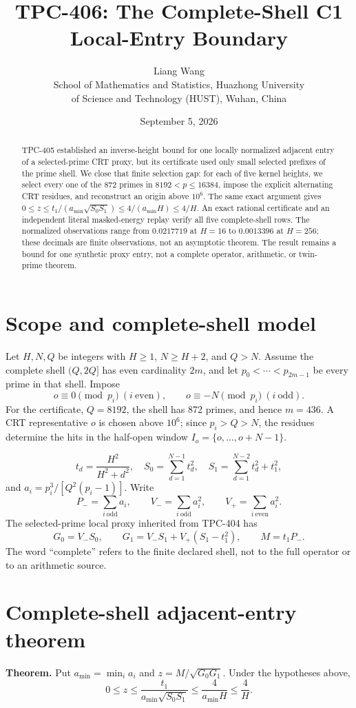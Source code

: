 \documentclass[11pt]{article}
\title{TPC-406: The Complete-Shell C1 Local-Entry Boundary}
\author{Liang Wang\\School of Mathematics and Statistics, Huazhong University\\of Science and Technology (HUST), Wuhan, China}
\date{September 5, 2026}
\begin{document}
\maketitle

\begin{abstract}
TPC-405 established an inverse-height bound for one locally normalized
adjacent entry of a selected-prime CRT proxy, but its certificate used only
small selected prefixes of the prime shell.  We close that finite selection
gap: for each of five kernel heights, we select every one of the 872 primes
in $8192<p\leq16384$, impose the explicit alternating CRT residues, and
reconstruct an origin above $10^6$.  The same exact argument gives
$0\leq z\leq t_1/(a_{\min}\sqrt{S_0S_1})\leq4/(a_{\min}H)\leq4/H$.
An exact rational certificate and an independent literal masked-energy
replay verify all five complete-shell rows.  The normalized observations
range from $0.0217719$ at $H=16$ to $0.0013396$ at $H=256$; these decimals
are finite observations, not an asymptotic theorem.  The result remains a
bound for one synthetic proxy entry, not a complete operator, arithmetic, or
twin-prime theorem.
\end{abstract}

\section{Scope and complete-shell model}
Let $H,N,Q$ be integers with $H\geq1$, $N\geq H+2$, and $Q>N$.  Assume the
complete shell $(Q,2Q]$ has even cardinality $2m$, and let
$p_0<\cdots<p_{2m-1}$ be every prime in that shell.  Impose
\[
 o\equiv0\pmod {p_i}\ (i\ \mathrm{even}),\qquad
 o\equiv-N\pmod {p_i}\ (i\ \mathrm{odd}).
\]
For the certificate, $Q=8192$, the shell has 872 primes, and hence
$m=436$.  A CRT representative $o$ is chosen above $10^6$; since
$p_i>Q>N$, the residues determine the hits in the half-open window
$I_o=\{o,\ldots,o+N-1\}$.

\[
 t_d=\frac{H^2}{H^2+d^2},\quad
 S_0=\sum_{d=1}^{N-1}t_d^2,\quad
 S_1=\sum_{d=1}^{N-2}t_d^2+t_1^2,
\]
and $a_i=p_i^3/[Q^2(p_i-1)]$.  Write
\[
 P_- =\sum_{i\ \mathrm{odd}}a_i,\qquad
 V_- =\sum_{i\ \mathrm{odd}}a_i^2,\qquad
 V_+ =\sum_{i\ \mathrm{even}}a_i^2.
\]
The selected-prime local proxy inherited from TPC-404 has
\[
 G_0=V_-S_0,\qquad G_1=V_-S_1+V_+(S_1-t_1^2),\qquad M=t_1P_-.
\]
The word ``complete'' refers to the finite declared shell, not to the full
operator or to an arithmetic source.

\section{Complete-shell adjacent-entry theorem}
\textbf{Theorem.} Put $a_{\min}=\min_i a_i$ and
$z=M/\sqrt{G_0G_1}$.  Under the hypotheses above,
\[
 0\leq z\leq\frac{t_1}{a_{\min}\sqrt{S_0S_1}}
 \leq\frac{4}{a_{\min}H}\leq\frac4H. \tag{1}
\]
\end{document}
